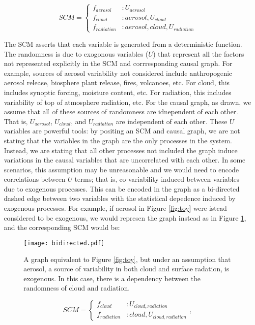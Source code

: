 \documentclass[12pt]{article}
\begin{document}
\begin{equation}
  SCM =
  \begin{cases}
    f_{aerosol} &: U_{aerosol} \\
    f_{cloud} &: aerosol, U_{cloud}  \\
    f_{radiation} &: aerosol, cloud, U_{radiation}
  \end{cases}
  \label{eq:1}
\end{equation}

The SCM asserts that each variable is generated from a deterministic
function. The randomness is due to exogonous variables ($U$) that
represent all the factors not represented explicitly in the SCM and
corrresponding causal graph. For example, sources of aerosol
variability not considered include anthropogenic aerosol release,
biosphere plant release, fires, volcanoes, etc. For cloud, this
includes synoptic forcing, moisture content, etc. For radiation, this
includes variability of top of atmosphere radiation, etc. For the
causal graph, as drawn, we assume that all of these sources of
randomness are idnependent of each other. That is, $U_{aerosol}$,
$U_{cloud}$, and $U_{radiation}$ are independent of each other. These
$U$ variables are powerful tools: by positing an SCM and causal graph,
we are not stating that the variables in the graph are the only
processes in the system. Instead, we are stating that all other
processes not included the graph induce variations in the causal
variables that are uncorrelated with each other. In some scenarios,
this assumption may be unreasonable and we would need to encode
correlations between $U$ terms; that is, co-variability induced
between variables due to exogenous processes. This can be encoded in
the graph as a bi-directed dashed edge between two variables with the
statistical depedence induced by exogenous processes. For example, if
aerosol in Figure \ref{fig:toy} were istead considered to be
exogenous, we would represen the graph instead as in Figure
\ref{fig:bi-directed}, and the corresponding SCM would be:

\begin{figure}
  \texttt{[image: bidirected.pdf]}
  \caption{A graph equivalent to Figure \ref{fig:toy}, but under an
    assumption that aerosol, a source of variability in both cloud and
    surface radation, is exogenous. In this case, there is a dependency
    between the randomness of cloud and radiation.}
  \label{fig:bi-directed}
\end{figure}

\begin{equation}
  SCM =
  \begin{cases}
    f_{cloud} &: U_{cloud,radiation}  \\
    f_{radiation} &: cloud, U_{cloud,radiation}
  \end{cases},
  \label{eq:2}
\end{equation}
\end{document}
